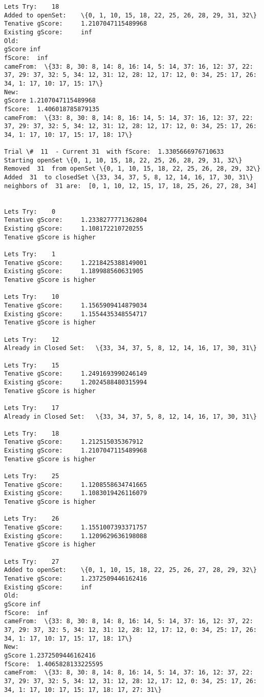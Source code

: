 \documentclass[11pt]{article}
\begin{document}
\begin{Verbatim}[commandchars=\\\{\}]
Lets Try:	 18
Added to openSet:	 \{0, 1, 10, 15, 18, 22, 25, 26, 28, 29, 31, 32\}
Tenative gScore:	 1.2107047115489968
Existing gScore:	 inf
Old:
gScore inf
fScore:  inf
cameFrom:  \{33: 8, 30: 8, 14: 8, 16: 14, 5: 14, 37: 16, 12: 37, 22: 37, 29: 37, 32: 5, 34: 12, 31: 12, 28: 12, 17: 12, 0: 34, 25: 17, 26: 34, 1: 17, 10: 17, 15: 17\}
New:
gScore 1.2107047115489968
fScore:  1.406018785879135
cameFrom:  \{33: 8, 30: 8, 14: 8, 16: 14, 5: 14, 37: 16, 12: 37, 22: 37, 29: 37, 32: 5, 34: 12, 31: 12, 28: 12, 17: 12, 0: 34, 25: 17, 26: 34, 1: 17, 10: 17, 15: 17, 18: 17\}

Trial \#  11  - Current 31  with fScore:  1.3305666976710633
Starting openSet \{0, 1, 10, 15, 18, 22, 25, 26, 28, 29, 31, 32\}
Removed  31  from openSet \{0, 1, 10, 15, 18, 22, 25, 26, 28, 29, 32\}
Added  31  to closedSet \{33, 34, 37, 5, 8, 12, 14, 16, 17, 30, 31\}
neighbors of  31 are:  [0, 1, 10, 12, 15, 17, 18, 25, 26, 27, 28, 34] 


Lets Try:	 0
Tenative gScore:	 1.2338277771362804
Existing gScore:	 1.108172210720255
Tenative gScore is higher

Lets Try:	 1
Tenative gScore:	 1.2218425388149001
Existing gScore:	 1.189988560631905
Tenative gScore is higher

Lets Try:	 10
Tenative gScore:	 1.1565909414879034
Existing gScore:	 1.1554435348554717
Tenative gScore is higher

Lets Try:	 12
Already in Closed Set:	 \{33, 34, 37, 5, 8, 12, 14, 16, 17, 30, 31\}

Lets Try:	 15
Tenative gScore:	 1.2491693990246149
Existing gScore:	 1.2024588480315994
Tenative gScore is higher

Lets Try:	 17
Already in Closed Set:	 \{33, 34, 37, 5, 8, 12, 14, 16, 17, 30, 31\}

Lets Try:	 18
Tenative gScore:	 1.212515035367912
Existing gScore:	 1.2107047115489968
Tenative gScore is higher

Lets Try:	 25
Tenative gScore:	 1.1208558634741665
Existing gScore:	 1.1083019426116079
Tenative gScore is higher

Lets Try:	 26
Tenative gScore:	 1.1551007393371757
Existing gScore:	 1.1209629636198088
Tenative gScore is higher

Lets Try:	 27
Added to openSet:	 \{0, 1, 10, 15, 18, 22, 25, 26, 27, 28, 29, 32\}
Tenative gScore:	 1.2372509446162416
Existing gScore:	 inf
Old:
gScore inf
fScore:  inf
cameFrom:  \{33: 8, 30: 8, 14: 8, 16: 14, 5: 14, 37: 16, 12: 37, 22: 37, 29: 37, 32: 5, 34: 12, 31: 12, 28: 12, 17: 12, 0: 34, 25: 17, 26: 34, 1: 17, 10: 17, 15: 17, 18: 17\}
New:
gScore 1.2372509446162416
fScore:  1.4065828133225595
cameFrom:  \{33: 8, 30: 8, 14: 8, 16: 14, 5: 14, 37: 16, 12: 37, 22: 37, 29: 37, 32: 5, 34: 12, 31: 12, 28: 12, 17: 12, 0: 34, 25: 17, 26: 34, 1: 17, 10: 17, 15: 17, 18: 17, 27: 31\}


\end{Verbatim}
\end{document}
